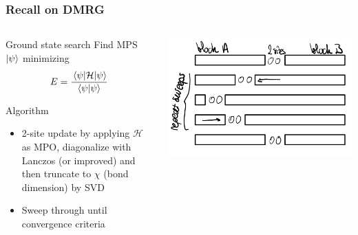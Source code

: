 \documentclass[10pt]{beamer}
\begin{document}
\begin{frame}
    \frametitle{Recall on DMRG}
    
    \begin{columns}
        \begin{column}{0.5\textwidth}
            \pause
            \begin{block}{Ground state search}
                Find MPS $\ket \psi$ minimizing $$E = \frac{\ev{\mathcal{H}}{\psi}}{\braket{\psi}}$$
            \end{block}

            \pause
            \begin{block}{Algorithm}
                \begin{itemize}
                    \item 2-site update by applying $\mathcal H$ as MPO, diagonalize with Lanczos (or improved) and then truncate to $\chi$ (bond dimension) by SVD 
                    \item Sweep through until convergence criteria
                \end{itemize}
            \end{block}
        \end{column}

        \begin{column}{0.55\textwidth}
            \includegraphics[scale=0.16]{figs/dmrgSweeps.png}
        \end{column}
    \end{columns}
\end{frame}
\end{document}
